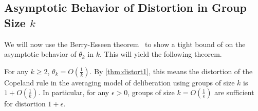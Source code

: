 \subsection{Asymptotic Behavior of Distortion in Group Size $k$}
We will now use the Berry-Esseen theorem~\cite{feller1971introduction} to show a tight bound of  on the asymptotic behavior of $\theta_k$ in $k$. This will yield the following theorem.

\begin{theorem}
\label{thm:berry}
For any $k \ge 2$,  $\theta_k = O\left(\frac{1}{k}\right)$. By \cref{thm:distort1}, this means the distortion of the Copeland rule in the averaging model of deliberation using groups of size $k$ is $1 + O\left(\frac{1}{k}\right)$. In particular, for any $\epsilon > 0$, groups of size $k = O\left(\frac{1}{\epsilon}\right)$ are sufficient for distortion $1+\epsilon$.  
\end{theorem}
